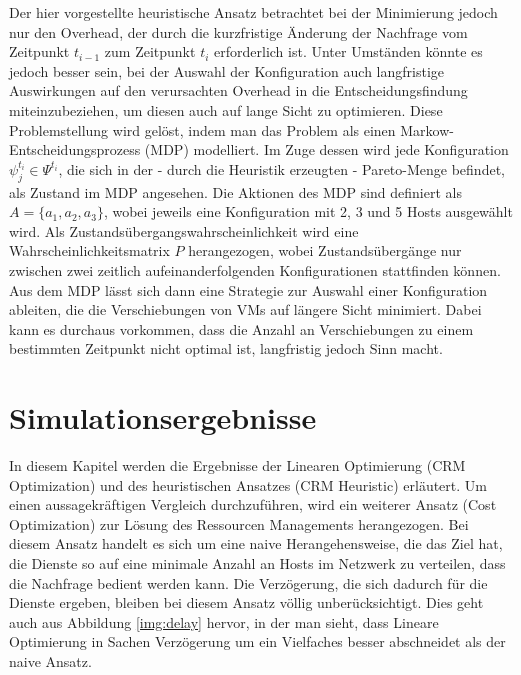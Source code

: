 \documentclass[conference]{IEEEtran}
\begin{document}
Der hier vorgestellte heuristische Ansatz betrachtet bei der Minimierung jedoch nur den Overhead, der durch die kurzfristige Änderung der Nachfrage vom Zeitpunkt \(t_{i-1}\) zum Zeitpunkt \(t_i\) erforderlich ist. Unter Umständen könnte es jedoch besser sein, bei der Auswahl der Konfiguration auch langfristige Auswirkungen auf den verursachten Overhead in die Entscheidungsfindung miteinzubeziehen, um diesen auch auf lange Sicht zu optimieren.
Diese Problemstellung wird gelöst, indem man das Problem als einen Markow-Entscheidungsprozess (MDP) modelliert. Im Zuge dessen wird jede Konfiguration \(\psi_j^{t_i} \in \Psi^{t_i}\), die sich in der - durch die Heuristik erzeugten - Pareto-Menge befindet, als Zustand im MDP angesehen. Die Aktionen des MDP sind definiert als 
\(A=\{a_1,a_2,a_3\}\), wobei jeweils eine Konfiguration mit 2, 3 und 5 Hosts ausgewählt wird.  Als Zustandsübergangswahrscheinlichkeit wird eine Wahrscheinlichkeitsmatrix \(P\) herangezogen, wobei Zustandsübergänge nur zwischen zwei zeitlich aufeinanderfolgenden Konfigurationen stattfinden können.
Aus dem MDP lässt sich dann eine Strategie zur Auswahl einer Konfiguration ableiten, die die Verschiebungen von VMs auf längere Sicht minimiert. Dabei kann es durchaus vorkommen, dass die Anzahl an Verschiebungen zu einem bestimmten Zeitpunkt nicht optimal ist, langfristig jedoch Sinn macht.


\section{Simulationsergebnisse}

In diesem Kapitel werden die Ergebnisse der Linearen Optimierung (CRM Optimization) und des heuristischen Ansatzes (CRM Heuristic) erläutert. Um einen aussagekräftigen Vergleich durchzuführen, wird ein weiterer Ansatz (Cost Optimization) zur Lösung des Ressourcen Managements herangezogen. Bei diesem Ansatz handelt es sich um eine naive Herangehensweise, die das Ziel hat, die Dienste so auf eine minimale Anzahl an Hosts im Netzwerk zu verteilen, dass die Nachfrage bedient werden kann. Die Verzögerung, die sich dadurch für die Dienste ergeben, bleiben bei diesem Ansatz völlig unberücksichtigt. Dies geht auch aus Abbildung \ref{img:delay} hervor, in der man sieht, dass Lineare Optimierung in Sachen Verzögerung um ein Vielfaches besser abschneidet als der naive Ansatz.
\end{document}
